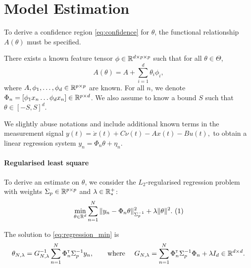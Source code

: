 \documentclass{article}
\begin{document}
\section{Model Estimation}

\label{sec:estimation}

To derive a confidence region \eqref{eq:confidence} for $\theta$, the functional relationship $A(\theta)$ must be specified.
\begin{assumption}[Structure]
\label{assumpt:structure}
There exists a known feature tensor $\phi\in \mathbb{R}^{d \times p \times p}$ such that for all $\theta\in\Theta$,
\begin{equation}
    A(\theta) = A + %
    \sum_{i=1}^d \theta_i\phi_i,
\end{equation}
where $A,\phi_1,\dots,\phi_d\in\mathbb{R}^{p\times p}$ are known. For all $n$, we denote $\Phi_n = [\phi_1 x_n \dots \phi_d x_n]\in\mathbb{R}^{p\times d}$.
We also assume to know a bound $S$ such that $\theta\in[-S,S]^d$.
\end{assumption}

We slightly abuse notations and include additional known terms in the measurement signal
$
    y(t) = \dot{x}(t) + C\nu(t) - A x(t) - Bu(t),
$ 
to obtain a linear regression system
$
y_n = \Phi_n\theta + \eta_n.
$

\paragraph{Regularised least square} To derive an estimate on $\theta$, we consider the $L_2$-regularised regression problem with weights $\Sigma_p\in\mathbb{R}^{p\times p}$ and $\lambda\in\mathbb{R}^+_*$:\hfill
$$
    \min_{\theta\in\Real^d} \sum_{n=1}^N \|y_n -\Phi_n\theta\|_{\Sigma_p^{-1}}^2 + \lambda\|\theta\|_{}^2.
    \refstepcounter{equation}~(\theequation)\label{eq:regression_min}
$$



\begin{proposition}
\label{prop:regularized_solution}
The solution to \eqref{eq:regression_min} is
\begin{align}
    \label{eq:vector_rls}
    \theta_{N,\lambda} = G_{N, \lambda}^{-1} \sum_{n=1}^N \Phi_n^{\mathsf{\scriptscriptstyle T}} \Sigma_p^{-1} y_n,\qquad
    \text{where }\quad G_{N, \lambda} = \sum_{n=1}^N \Phi_{n}^{\mathsf{\scriptscriptstyle T}}\Sigma_p^{-1}\Phi_{n}  + \lambda I_d \in \mathbb{R}^{d\times d}.
\end{align}
\end{proposition}
\end{document}
